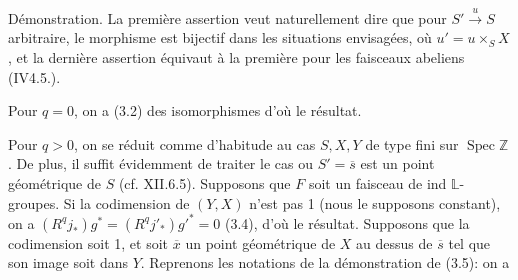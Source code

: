 Démonstration. La première assertion veut naturellement dire que pour $S'\xrightarrow{u}S$ arbitraire, le morphisme
\diagram{\[
\begin{tikzcd}
{u'}^*(R^qj_*)g^*F\arrow[r]&(R^qj'_*){g'}^*u^*F
\end{tikzcd}
\]}
est bijectif dans les situations envisagées, où $u'=u\times_S X$, et la dernière assertion équivaut à la première pour les faisceaux abeliens (IV4.5.).

Pour $q=0$, on a (3.2) des isomorphismes
d'où le résultat.

Pour $q>0$, on se réduit comme d'habitude au cas $S,X,Y$ de type fini sur $\operatorname{Spec}\mathbb Z$. De plus, il suffit  évidemment de traiter le cas ou $S'=\overline s$ est un point  géométrique de $S$ (cf. XII.6.5).
\margin{!}
Supposons que $F$ soit un faisceau de  ind $\mathbb L$-groupes. Si la codimension de $(Y,X)$ n'est pas 1 \deleted{\unsure{,}} (nous le supposons constant), on a $(R^qj_*)g^*=(R^qj'_*){g'}^*=0$ (3.4), d'où le résultat. Supposons que la codimension soit 1, et soit $\overline x$ un point géométrique de $X$ au dessus de $\overline s$ tel que son image soit dans $Y$. Reprenons les  notations de la démonstration de (3.5): on a
